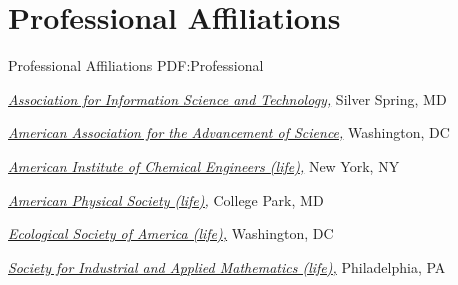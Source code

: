 \section
{Professional Affiliations}
{Professional Affiliations}
{PDF:Professional}

\href{https://www.asist.org/}
{\textit{Association for Information Science and Technology,}}
Silver Spring, MD

\Gap
\href{http://www.aaas.org/}
{\textit{American Association for the Advancement of Science,}}
Washington, DC

\Gap
\href{http://www.aiche.org/}
{\textit{American Institute of Chemical Engineers (life),}}
New York, NY

\Gap
\href{http://www.aps.org/}
{\textit{American Physical Society (life),}}
College Park, MD

\Gap
\href{http://www.esa.org/esa/}
{\textit{Ecological Society of America (life),}}
Washington, DC

\Gap
\href{http://siam.org/}
{\textit{Society for Industrial and Applied Mathematics (life),}}
Philadelphia, PA

\Gap
\vspace*{0.2cm}